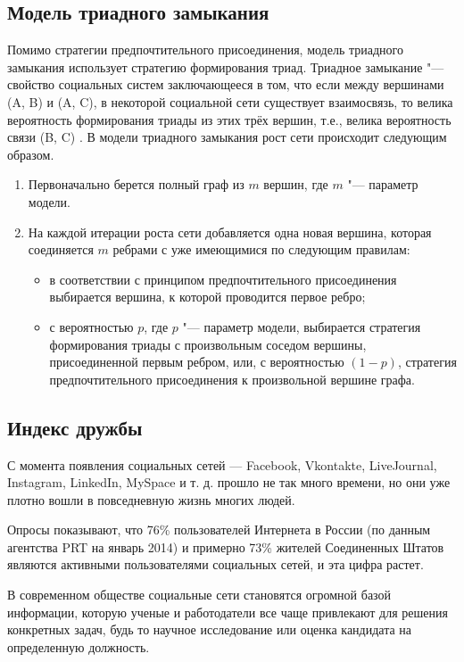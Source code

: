 \documentclass[bachelor, och, diploma]{SCWorks}
\begin{document}
\subsection{Модель триадного замыкания}
Помимо стратегии предпочтительного присоединения, модель триадного замыкания использует стратегию формирования триад. Триадное замыкание "---свойство социальных систем заключающееся в том, что если между вершинами (A, B) и (A, C), в некоторой социальной сети существует взаимосвязь, то велика вероятность формирования триады из этих трёх вершин, т.е., велика вероятность связи (B, C) \cite{ts}.  В модели триадного замыкания рост сети происходит следующим образом.
\begin{enumerate}
\item Первоначально берется полный граф из $ m $ вершин, где $ m $ "--- параметр модели. 
\item На каждой итерации роста сети добавляется одна новая вершина, которая соединяется $ m $ ребрами с уже имеющимися  по следующим правилам:
\begin{itemize}
\item в соответствии с принципом предпочтительного присоединения выбирается вершина, к которой проводится первое ребро;
\item с вероятностью $ p $, где $ p $ "--- параметр модели, выбирается стратегия формирования триады с произвольным соседом вершины, присоединенной первым ребром, или, с вероятностью $ (1-p) $, стратегия предпочтительного присоединения к произвольной вершине графа.
\end{itemize}
\end{enumerate}

\subsection{Индекс дружбы}

С момента появления социальных сетей  — Facebook, Vkontakte, LiveJournal, Instagram, LinkedIn, MySpace и т. д. прошло не так много времени, но они уже плотно вошли в повседневную жизнь многих людей.

Опросы показывают, что 76\% пользователей Интернета в России (по данным агентства PRT на январь 2014) и примерно 73\% жителей Соединенных Штатов являются активными пользователями социальных сетей, и эта цифра растет\cite{psych}.

В современном обществе социальные сети становятся огромной базой информации, которую ученые и работодатели все чаще привлекают для решения конкретных задач, будь то научное исследование или оценка кандидата на определенную должность.
\end{document}
